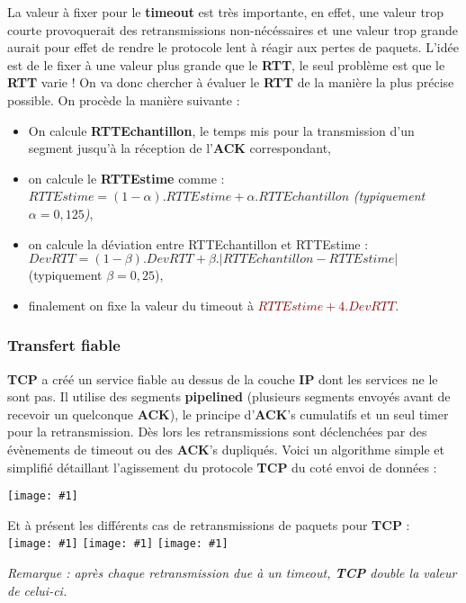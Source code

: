 \documentclass{article}
\newcommand{\dred}[1]{\textcolor{darkred}{\textbf{#1}}}
\newcommand{\imageRT}[2]{\texttt{[image: \#1]}}
\newcommand{\imgRT}[2]{\begin{center}\texttt{[image: \#1]}\end{center}}
\begin{document}
La valeur à fixer pour le \textbf{timeout} est très importante, en effet, une valeur trop courte provoquerait 
des retransmissions non-nécéssaires et une valeur trop grande aurait pour effet de rendre le protocole lent à 
réagir aux pertes de paquets. L'idée est de le fixer à une valeur plus grande que le \textbf{RTT}, le seul
problème est que le \textbf{RTT} varie ! On va donc chercher à évaluer le \textbf{RTT} de la manière la plus 
précise possible. On procède la manière suivante :
\begin{itemize}
\item On calcule \textbf{RTTEchantillon}, le temps mis pour la transmission d'un segment jusqu'à la réception de 
l'\textbf{ACK} correspondant,
\item on calcule le \textbf{RTTEstime} comme : $RTTEstime = (1-\alpha).RTTEstime+\alpha.RTTEchantillon$
\textit{(typiquement $\alpha = 0,125$)},
\item on calcule la déviation entre RTTEchantillon et RTTEstime : $DevRTT = (1-\beta).DevRTT+\beta. |
RTTEchantillon-RTTEstime|$ (typiquement $\beta = 0,25$),
\item finalement on fixe la valeur du timeout à \dred{$RTTEstime+4.DevRTT$}.
\end{itemize}

\subsubsection{Transfert fiable}

\textbf{TCP} a créé un service fiable au dessus de la couche \textbf{IP} dont les services ne le sont pas. Il 
utilise des segments \textbf{pipelined} (plusieurs segments envoyés avant de recevoir un quelconque 
\textbf{ACK}), le principe d'\textbf{ACK}'s cumulatifs et un seul timer pour la retransmission. Dès lors les
retransmissions sont déclenchées par des évènements de timeout ou des \textbf{ACK}'s dupliqués. Voici un 
algorithme simple et simplifié détaillant l'agissement du protocole \textbf{TCP} du coté envoi de données : 

\imgRT{CN_047.png}{225}

Et à présent les différents cas de retransmissions de paquets pour \textbf{TCP} : \\

\imageRT{CN_048.png}{175}
\imageRT{CN_049.png}{175}
\imageRT{CN_050.png}{175}

\textit{Remarque : après chaque retransmission due à un timeout, \textbf{TCP} double la valeur de celui-ci.}
\end{document}
